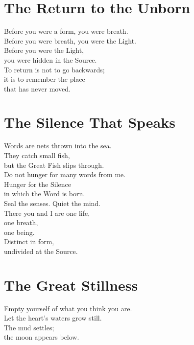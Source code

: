 \documentclass[10pt, openright]{book}
\newcommand{\sectionbreak}{\filbreak}
\newcommand{\sayingsource}[1]{\par\nopagebreak\vspace{0.3\baselineskip}{\raggedleft\footnotesize\itshape #1\par}}
\begin{document}
\sayingsource{Tao Te Ching 13 · Ashtavakra Gita 1.11}

\sectionbreak

\section{The Return to the Unborn}\label{the-return-to-the-unborn}

Before you were a form, you were breath.\\
Before you were breath, you were the Light.\\
Before you were the Light,\\
you were hidden in the Source.\\
To return is not to go backwards;\\
it is to remember the place\\
that has never moved.

\sayingsource{Tao Te Ching 14 · Thomas 18--19 · Hymn of the Pearl}

\sectionbreak

\section{The Silence That Speaks}\label{the-silence-that-speaks}

Words are nets thrown into the sea.\\
They catch small fish,\\
but the Great Fish slips through.\\
Do not hunger for many words from me.\\
Hunger for the Silence\\
in which the Word is born.\\
Seal the senses. Quiet the mind.\\
There you and I are one life,\\
one breath,\\
one being.\\
Distinct in form,\\
undivided at the Source.

\sayingsource{Tao Te Ching 56 · Thomas 8 · John 10:30}

\sectionbreak

\section{The Great Stillness}\label{the-great-stillness}

Empty yourself of what you think you are.\\
Let the heart's waters grow still.\\
The mud settles;\\
the moon appears below.
\end{document}
